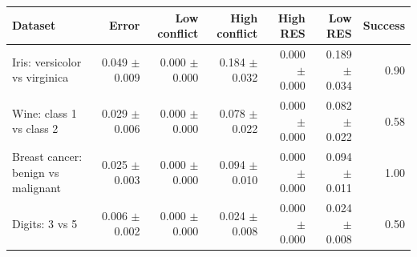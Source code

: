 \begin{tabular}{lrrrrrr}
\toprule
Dataset & Error & Low conflict & High conflict & High RES & Low RES & Success \\
\midrule
Iris: versicolor vs virginica & 0.049 $\pm$ 0.009 & 0.000 $\pm$ 0.000 & 0.184 $\pm$ 0.032 & 0.000 $\pm$ 0.000 & 0.189 $\pm$ 0.034 & 0.90 \\
Wine: class 1 vs class 2 & 0.029 $\pm$ 0.006 & 0.000 $\pm$ 0.000 & 0.078 $\pm$ 0.022 & 0.000 $\pm$ 0.000 & 0.082 $\pm$ 0.022 & 0.58 \\
Breast cancer: benign vs malignant & 0.025 $\pm$ 0.003 & 0.000 $\pm$ 0.000 & 0.094 $\pm$ 0.010 & 0.000 $\pm$ 0.000 & 0.094 $\pm$ 0.011 & 1.00 \\
Digits: 3 vs 5 & 0.006 $\pm$ 0.002 & 0.000 $\pm$ 0.000 & 0.024 $\pm$ 0.008 & 0.000 $\pm$ 0.000 & 0.024 $\pm$ 0.008 & 0.50 \\
\bottomrule
\end{tabular}

